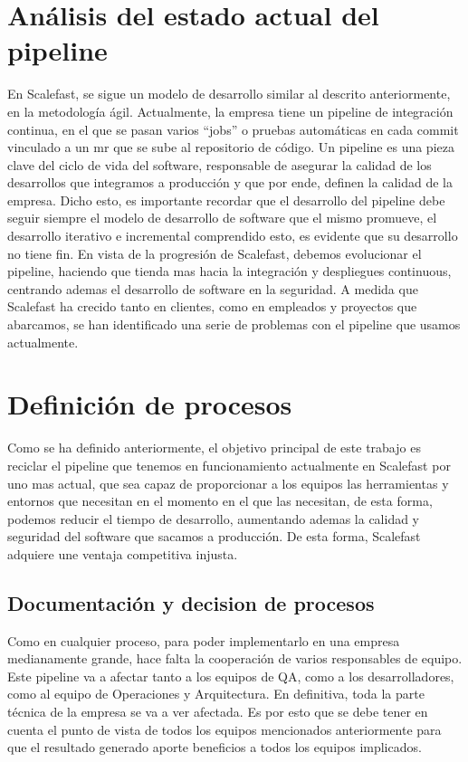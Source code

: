 \documentclass[12pt]{report} %
\begin{document}
\section{Análisis del estado actual del pipeline} %

En Scalefast, se sigue un modelo de desarrollo similar al descrito anteriormente, en la metodología ágil.
Actualmente, la empresa tiene un \gls{pipeline} de integración continua, en el que se pasan varios ``jobs'' o pruebas automáticas en cada commit vinculado a un \acrfull{mr} que se sube al repositorio de código.
Un \gls{pipeline} es una pieza clave del ciclo de vida del software, responsable de asegurar la calidad de los desarrollos que integramos a producción y que por ende, definen la calidad de la empresa.
Dicho esto, es importante recordar que el desarrollo del \gls{pipeline} debe seguir siempre el modelo de desarrollo de software que el mismo promueve, el desarrollo iterativo e incremental comprendido esto, es evidente que su desarrollo no tiene fin.
En vista de la progresión de Scalefast, debemos evolucionar el pipeline, haciendo que tienda mas hacia la integración y despliegues continuous, centrando ademas el desarrollo de software en la seguridad.
A medida que Scalefast ha crecido tanto en clientes, como en empleados y proyectos que abarcamos, se han identificado una serie de problemas con el \gls{pipeline} que usamos actualmente.

\section{Definición de procesos}

Como se ha definido anteriormente, el objetivo principal de este trabajo es reciclar el \gls{pipeline} que tenemos en funcionamiento actualmente en Scalefast por uno mas actual, que sea capaz de proporcionar a los equipos las herramientas y entornos que necesitan en el momento en el que las necesitan, de esta forma, podemos reducir el tiempo de desarrollo, aumentando ademas la calidad y seguridad del software que sacamos a producción.
De esta forma, Scalefast adquiere une ventaja competitiva injusta.

\subsection{Documentación y decision de procesos}

Como en cualquier proceso, para poder implementarlo en una empresa medianamente grande, hace falta la cooperación de varios responsables de equipo.
Este \gls{pipeline} va a afectar tanto a los equipos de QA, como a los desarrolladores, como al equipo de Operaciones y Arquitectura.
En definitiva, toda la parte técnica de la empresa se va a ver afectada.
Es por esto que se debe tener en cuenta el punto de vista de todos los equipos mencionados anteriormente para que el resultado generado aporte beneficios a todos los equipos implicados.
\end{document}
